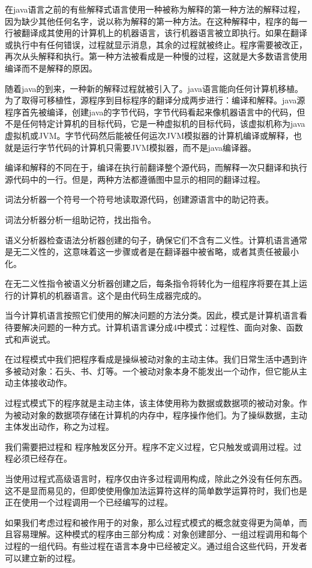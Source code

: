 在java语言之前的有些解释式语言使用一种被称为解释的第一种方法的解释过程，因为缺少其他任何名字，说以称为解释的第一种方法。在这种解释中，程序的每一行被翻译成其使用的计算机上的机器语言，该行机器语言被立即执行。如果在翻译或执行中有任何错误，过程就显示消息，其余的过程就被终止。程序需要被改正，再次从头解释和执行。第一种方法被看成是一种慢的过程，这就是大多数语言使用编译而不是解释的原因。

随着java的到来，一种新的解释过程就被引入了。java语言能向任何计算机移植。为了取得可移植性，源程序到目标程序的翻译分成两步进行：编译和解释。java源程序首先被编译，创建java的字节代码，字节代码看起来像机器语言中的代码，但不是任何特定计算机的目标代码，它是一种虚拟机的目标代码，该虚拟机称为java虚拟机或JVM。字节代码然后能被任何运次JVM模拟器的计算机编译或解释，也就是运行字节代码的计算机只需要JVM模拟器，而不是java编译器。

编译和解释的不同在于，编译在执行前翻译整个源代码，而解释一次只翻译和执行源代码中的一行。但是，两种方法都遵循图中显示的相同的翻译过程。

词法分析器一个符号一个符号地读取源代码，创建源语言中的助记符表。

词法分析器分析一组助记符，找出指令。

语义分析器检查语法分析器创建的句子，确保它们不含有二义性。计算机语言通常是无二义性的，这意味着这一步骤或者是在翻译器中被省略，或者其责任被最小化。

在无二义性指令被语义分析器创建之后，每条指令将转化为一组程序将要在其上运行的计算机的机器语言。这个是由代码生成器完成的。

当今计算机语言按照它们使用的解决问题的方法分类。因此，模式是计算机语言看待要解决问题的一种方式。计算机语言课分成4中模式：过程性、面向对象、函数式和声说式。

在过程模式中我们把程序看成是操纵被动对象的主动主体。我们日常生活中遇到许多被动对象：石头、书、灯等。一个被动对象本身不能发出一个动作，但它能从主动主体接收动作。

过程式模式下的程序就是主动主体，该主体使用称为数据或数据项的被动对象。作为被动对象的数据项存储在计算机的内存中，程序操作他们。为了操纵数据，主动主体发出动作，称之为过程。

我们需要把过程和 程序触发区分开。程序不定义过程，它只触发或调用过程。过程必须已经存在。

当使用过程式高级语言时，程序仅由许多过程调用构成，除此之外没有任何东西。这不是显而易见的，但即使使用像加法运算符这样的简单数学运算符时，我们也是正在使用一个过程调用一个已经编写的过程。

如果我们考虑过程和被作用于的对象，那么过程式模式的概念就变得更为简单，而且容易理解。这种模式的程序由三部分构成：对象创建部分、一组过程调用和每个过程的一组代码。有些过程在语言本身中已经被定义。通过组合这些代码，开发者可以建立新的过程。

